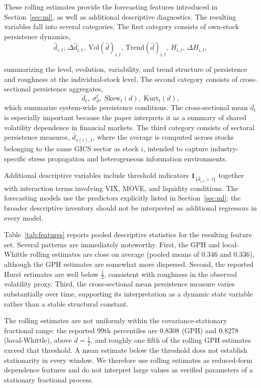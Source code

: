 \documentclass[jrfm,article,submit,moreauthors,pdftex]{Definitions/mdpi}
\begin{document}
These rolling estimates provide the forecasting features introduced in
Section~\ref{sec:ml}, as well as additional descriptive diagnostics. The
resulting variables fall into several categories. The first category consists of own-stock
persistence dynamics,
\begin{equation}
  \hat{d}_{i,t},\, \Delta \hat{d}_{i,t},\;
  \mathrm{Vol}( \hat{d})_{i,t},\, \mathrm{Trend}( \hat{d})_{i,t},\,  H_{i,t},\, \Delta H_{i,t},
\end{equation}

summarizing the level, evolution, variability, and trend structure of
persistence and roughness at the individual-stock level. The second
category consists of cross-sectional persistence aggregates,
\begin{equation}
  \overline{d}_t,\;\sigma_d^t,\;\mathrm{Skew}_t(d),\;\mathrm{Kurt}_t(d),
\end{equation}
which summarize system-wide persistence conditions. The cross-sectional
mean $\overline d_t$ is especially important because the paper interprets
it as a summary of shared volatility dependence in
financial markets. The third category consists of sectoral persistence
measures, $\overline d_{s(i),t}$, where the average is computed across
stocks belonging to the same GICS sector as stock $i$, intended to capture
industry-specific stress propagation and heterogeneous information environments.


Additional descriptive variables include threshold indicators $\mathbf 1_{\{ \hat{d}_{i,t}
> \tau\}}$ together with interaction terms involving VIX, MOVE, and
liquidity conditions. The forecasting models use the predictors explicitly
listed in Section~\ref{sec:ml}; the broader descriptive inventory should
not be interpreted as additional regressors in every model.

Table~\ref{tab:features} reports pooled descriptive statistics for the
resulting feature set. Several patterns are immediately noteworthy. First,
the GPH and local-Whittle rolling estimates are close on average (pooled
means of 0.346 and 0.336), although the GPH estimates are somewhat more
dispersed. Second, the reported Hurst
estimates are well below $\frac{1}{2}$, consistent with roughness in the
observed volatility proxy. Third, the cross-sectional mean persistence measure varies
substantially over time, supporting its interpretation as a dynamic state
variable rather than a stable structural constant.


The rolling estimates are not uniformly within the covariance-stationary
fractional range: the reported 99th percentiles are 0.8308 (GPH) and 0.8278
(local-Whittle), above $d=\frac{1}{2}$, and roughly one fifth of the rolling
GPH estimates exceed that threshold. A mean estimate below the threshold does
not establish stationarity in every window. We therefore use rolling estimates
as reduced-form dependence features and do not interpret large values as
verified parameters of a stationary fractional process.
\end{document}
